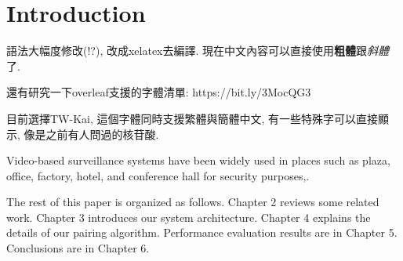 \chapter{Introduction}
\label{ch:intro}

語法大幅度修改(!?), 改成xelatex去編譯. 現在中文內容可以直接使用\textbf{粗體}跟\textit{斜體}了. 

還有研究一下overleaf支援的字體清單: https://bit.ly/3MocQG3

目前選擇TW-Kai, 這個字體同時支援繁體與簡體中文, 有一些特殊字可以直接顯示, 像是之前有人問過的核苷酸.

Video-based surveillance systems have been widely used in places such as plaza, office, factory, hotel, and conference hall for security purposes\cite{collins2000system},\cite{wang2013intelligent}. 

The rest of this paper is organized as follows. Chapter 2 reviews some related work. Chapter 3 introduces our system architecture. Chapter 4 explains the details of our pairing algorithm. Performance evaluation results are in Chapter 5. Conclusions are in Chapter 6.
